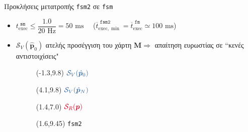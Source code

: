 \begin{frame}{Προκλήσεις μετατροπής \texttt{fsm2} σε \texttt{fsm}}


  \begin{itemize}
    \item $t_{\text{exec}}^{\texttt{\ sm}} \leq \dfrac{1.0}{20\text{ Hz}} = 50 \text{ ms}$ \ \ ($\overline{t}_{\text{exec},\min}^{\texttt{\ fsm2}} = \overline{t}_{\text{exec}}^{\texttt{\ fm}} \simeq 100 \text{ ms}$)
    \item $\mathcal{S}_V(\hat{\bm{p}}_0)$ ατελής προσέγγιση του χάρτη $\bm{M} \Rightarrow$ απαίτηση ευρωστίας σε ``\textcolor{m}{κενές αντιστοιχίσεις}"
          \vspace{0.3cm}
          \begin{figure}\centering
            \resizebox{4cm}{!}{}
            \begin{textblock}{14}(-1.3,9.8)
              $\textcolor{b}{\mathcal{S}_V(\hat{\bm{p}}_0)}$
            \end{textblock}
            \begin{textblock}{14}(4.1,9.8)
              $\textcolor{b}{\mathcal{S}_V(\hat{\bm{p}}_N)}$
            \end{textblock}
            \begin{textblock}{14}(1.4,7.0)
              $\textcolor{r}{\mathcal{S}_R(\bm{p})}$
            \end{textblock}
            \begin{textblock}{14}(1.6,9.45)
              \tiny \texttt{fsm2}
            \end{textblock}
          \end{figure}
  \end{itemize}




\end{frame}
